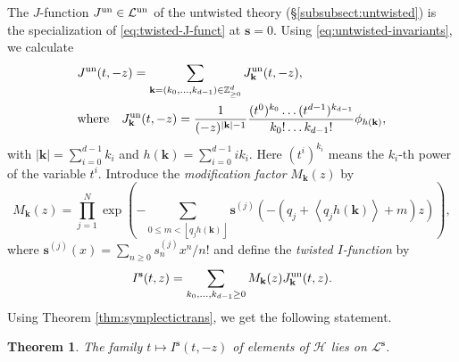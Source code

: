 \documentclass[11pt]{amsart}
\newtheorem{thm}{Theorem}[section] %
\theoremstyle{definition} %
\theoremstyle{remark} %
\newcommand{\ZZ}{\mathbb Z}
\newcommand{\tw}{{\rm tw}}
\newcommand{\un}{{\rm un}}
\providecommand{\abs}[1]{\lvert#1\rvert}
\def\nn{N}
\def\fracp#1{\left\langle #1 \right\rangle}
\def\floor#1{\left\lfloor #1 \right\rfloor}
\newcommand{\bs}{\mathbf{s}}
\newcommand{\bk}{\mathbf{k}}
\newcommand{\cL}{\mathcal{L}}
\newcommand{\cH}{\mathcal{H}}
\newcommand{\FJRW}{{\operatorname{FJRW}}}
\begin{document}
The $J$-function $J^\un\in \cL^\un$ of the 
untwisted theory (\S \ref{subsubsect:untwisted}) 
is the specialization of \eqref{eq:twisted-J-funct} 
at $\bs =0$. 
Using \eqref{eq:untwisted-invariants}, we calculate  
\begin{align*}
& J^\un (t,-z )  =
\sum_{\bk=(k_0,\dots, k_{d-1}) \in \ZZ^d_{\ge 0}}
J_{\bk}^{\un}(t,-z), \\  
& \text{where} \quad 
J_{\bk}^{\un}(t,-z) = \frac{1}{(-z)^{\abs{\bk}-1}} 
\frac{(t^0)^{k_0} \dots (t^{d-1})^{k_{d-1}}}{k_0!\dots k_{d-1}!}
{\phi}_{h(\bk)}, 
\end{align*}
with $|\bk| = \sum_{i=0}^{d-1}k_i$ 
and $h(\bk) = \sum_{i=0}^{d-1} i k_i$. 
Here $(t^i)^{k_i}$ means the $k_i$-th power of the variable $t^i$.  
Introduce the \emph{modification factor} $M_{\bk}(z)$ by 
\[
M_{\bk}(z)=\prod_{j=1}^\nn 
\exp\left(-\sum_{0\le  m<\floor{q_jh(\bk)}} 
\bs^{(j)} 
\left(- (q_j +\fracp{q_j h(\bk)}+m) z \right)\right),
\]
where $\bs^{(j)}(x)=\sum_{n\ge 0} s^{(j)}_n x^n/n!$ 
and define the \emph{twisted $I$-function} by  
\begin{equation} 
\label{eq:twisted-I-funct} 
I^\bs (t,z)=\sum_{k_0,\dots,k_{d-1}\ge 0} M_{\bk}(z)J^\un_{\bk}(t,z).
\end{equation} 
Using Theorem \ref{thm:symplectictrans}, 
we get the following statement. 
\begin{thm}
\label{thm:I_is_on_the_cone}
The family $t\mapsto I^\bs(t,-z)$ of elements of $\cH$ 
lies on $\cL^\bs$.  
\end{thm}
\end{document}
